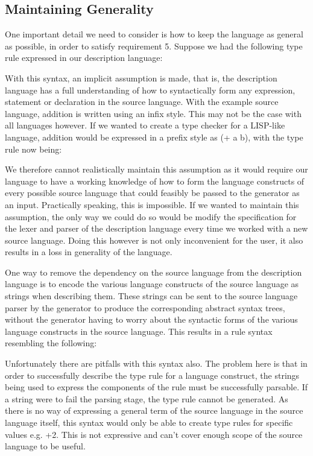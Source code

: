 \documentclass{UoYCSproject}
\begin{document}
\subsection{Maintaining Generality}
One important detail we need to consider is how to keep the language as general as
possible, in order to satisfy requirement 5. Suppose we had the following type rule expressed in our description
language:

With this syntax, an implicit assumption is made, that is, the description
language has a full understanding of how to syntactically form any expression, 
statement or declaration in the source language. With the example source language,
addition is written using an infix style. This may not be the case with all 
languages however. If we wanted to create a type checker for a LISP-like language,
addition would be expressed in a prefix style as {\ttfamily (+ a b)}, with the
type rule now being:

We therefore cannot realistically maintain this assumption as it would require
our language to have a working knowledge of how to form the language constructs
of every possible source language that could feasibly be passed to the generator 
as an input. Practically speaking, this is impossible. If we wanted to maintain
this assumption, the only way we could do so would be modify the specification
for the lexer and parser of the description language every time we worked with
a new source language. Doing this however is not only inconvenient for the user,
it also results in a loss in generality of the language.

One way to remove the dependency on the source language from the description
language is to encode the various language constructs of the source language as 
strings when describing them. These strings can be sent to the source language 
parser by the generator to produce the corresponding abstract syntax trees, 
without the generator having to worry about the syntactic forms of the various 
language constructs in the source language. This results in a rule syntax 
resembling the following:

Unfortunately there are pitfalls with this syntax also. The problem here is that 
in order to successfully describe the type rule for a language construct, the
strings being used to express the components of the rule must be 
successfully parsable. If a string were to fail the parsing stage, the type 
rule cannot be generated. As there is no way of expressing a general term of
the source language in the source language itself, this syntax would only
be able to create type rules for specific values e.g.
{+2}. This is not expressive and can't cover enough scope of the 
source language to be useful.
\end{document}
